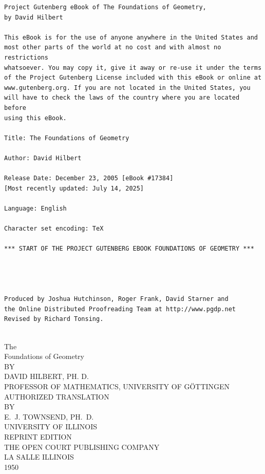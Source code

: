 \documentclass[11pt,oneside]{book}
\begin{document}
\newcommand{\rfa}[1]{\subsection*{\begin{center}#1\end{center}}}
\newcommand{\rfb}[0]{\hspace{-3.2mm}}

\thispagestyle{empty}
\small
\begin{verbatim}
Project Gutenberg eBook of The Foundations of Geometry,
by David Hilbert

This eBook is for the use of anyone anywhere in the United States and
most other parts of the world at no cost and with almost no restrictions
whatsoever. You may copy it, give it away or re-use it under the terms
of the Project Gutenberg License included with this eBook or online at
www.gutenberg.org. If you are not located in the United States, you
will have to check the laws of the country where you are located before
using this eBook.

Title: The Foundations of Geometry

Author: David Hilbert

Release Date: December 23, 2005 [eBook #17384]
[Most recently updated: July 14, 2025]

Language: English

Character set encoding: TeX

*** START OF THE PROJECT GUTENBERG EBOOK FOUNDATIONS OF GEOMETRY ***




Produced by Joshua Hutchinson, Roger Frank, David Starner and
the Online Distributed Proofreading Team at http://www.pgdp.net
Revised by Richard Tonsing.


\end{verbatim}
\normalsize
\newpage

\frontmatter
\pagestyle{empty}

\begin{titlepage}
\begin{center}
\vspace*{1cm}
{\Large The}\\[4mm]
{\Huge Foundations of Geometry}\\[12mm]
{\small BY}\\[3mm]
{\large DAVID HILBERT, PH\@. D.}\\[3mm]
{\tiny PROFESSOR OF MATHEMATICS, UNIVERSITY OF G\"OTTINGEN}\\[3cm]
{\small AUTHORIZED TRANSLATION}\\[3mm]
BY\\[3mm]
{\large E.~J. TOWNSEND, PH.\ D.}\\[3mm]
{\tiny UNIVERSITY OF ILLINOIS}\\[4cm]
REPRINT EDITION\\[1cm]
THE OPEN COURT PUBLISHING COMPANY\\[4mm]
LA SALLE \hspace*{4cm} ILLINOIS\\[4mm]
1950
\end{center}
\end{titlepage}
\end{document}
